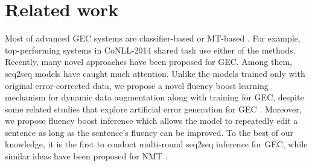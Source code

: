 \documentclass{article} %
\begin{document}
\section{Related work}

Most of advanced GEC systems are classifier-based \citep{chodorow2007detection,de2008classifier,han2010using,leacock2010automated,tetreault2010using,dale2011helping}
or MT-based
\citep{brockett2006correcting,dahlmeier2011correcting,dahlmeier2012beam,yoshimoto2013naist,yuan2013constrained,behera2013automated}. For example, top-performing systems \citep{felice2014grammatical,rozovskaya2014illinois,junczys2014amu} in CoNLL-2014 shared task \citep{ng2014conll} use either of the methods. Recently, many novel approaches
\citep{Susanto2014System,chollampatt2016neural,chollampatt2016adapting,rozovskaya2016grammatical,junczys2016phrase,mizumoto2016discriminative,Yuan2016Candidate,Hoang2016Exploiting,yannakoudakis2017neural} have been proposed for GEC. Among them, seq2seq models \citep{yuan2016grammatical,xie2016neural,ji2017nested,sakaguchi2017grammatical,schmaltz-EtAl:2017:EMNLP2017,chollampatt2018,junczys2018approaching} have caught much attention. 
Unlike the models trained only with original error-corrected data, we propose a novel fluency boost learning mechanism for dynamic data augmentation along with training for GEC, despite some related studies that explore artificial error generation for GEC \citep{brockett2006correcting,foster2009generrate,rozovskaya2010training,rozovskaya2011algorithm,Rozovskaya2012The,felice-yuan:2014:SRW,xie2016neural,rei2017artificial,xie2018noising}. Moreover, we propose fluency boost inference which allows the model to repeatedly edit a sentence as long as the sentence's fluency can be improved. To the best of our knowledge, it is the first to conduct multi-round seq2seq inference for GEC, while similar ideas have been proposed for NMT \citep{DXiaTWLQYL17}.
\end{document}
